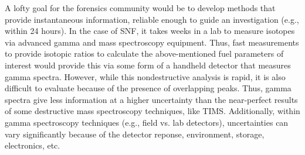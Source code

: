 A lofty goal for the forensics community would be to develop methods that
provide instantaneous information, reliable enough to guide an investigation
(e.g., within 24 hours). In the case of \gls{SNF}, it takes weeks in a lab to
measure isotopes via advanced gamma and mass spectroscopy equipment. Thus, fast
measurements to provide isotopic ratios to calculate the above-mentioned fuel
parameters of interest would provide this via some form of a handheld detector
that measures gamma spectra.  However, while this nondestructive analysis is
rapid, it is also difficult to evaluate because of the presence of overlapping
peaks. Thus, gamma spectra give less information at a higher uncertainty than
the near-perfect results of some destructive mass spectroscopy techniques, like
TIMS.  Additionally, within gamma
spectroscopy techniques (e.g., field vs. lab detectors), uncertainties can vary
significantly because of the detector reponse, environment, storage,
electronics, etc. 

